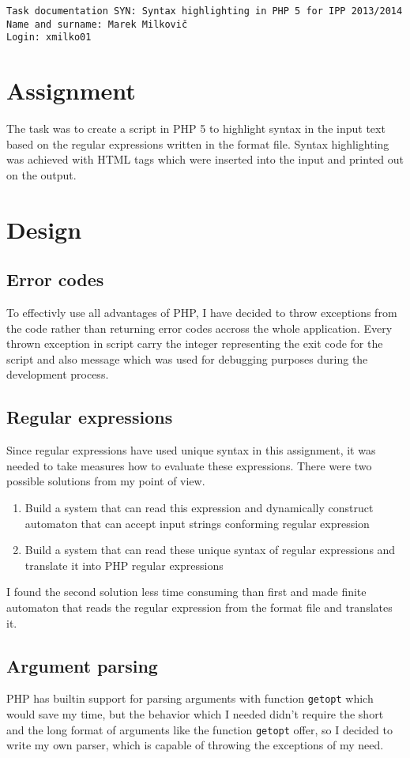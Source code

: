 \documentclass[12pt,a4paper,final]{article}
\begin{document}
\noindent
\texttt{Task documentation SYN: Syntax highlighting in PHP 5 for IPP 2013/2014} \\
\texttt{Name and surname: Marek Milkovič} \\
\texttt{Login: xmilko01}

\section{Assignment}
The task was to create a script in PHP 5 to highlight syntax in the input text based on the regular expressions written in the format file. Syntax highlighting was achieved with HTML tags which were inserted into the input and printed out on the output.

\section{Design}
\subsection{Error codes}
To effectivly use all advantages of PHP, I have decided to throw exceptions from the code rather than returning error codes accross the whole application. Every thrown exception in script carry the integer representing the exit code for the script and also message which was used for debugging purposes during the development process.

\subsection{Regular expressions}
Since regular expressions have used unique syntax in this assignment, it was needed to take measures how to evaluate these expressions. There were two possible solutions from my point of view.
\begin{enumerate}
\item Build a system that can read this expression and dynamically construct automaton that can accept input strings conforming regular expression
\item Build a system that can read these unique syntax of regular expressions and translate it into PHP regular expressions
\end{enumerate}
I found the second solution less time consuming than first and made finite automaton that reads the regular expression from the format file and translates it.

\subsection{Argument parsing}
PHP has builtin support for parsing arguments with function \texttt{getopt} which would save my time, but the behavior which I needed didn't require the short and the long format of arguments like the function \texttt{getopt} offer, so I decided to write my own parser, which is capable of throwing the exceptions of my need.
\end{document}
